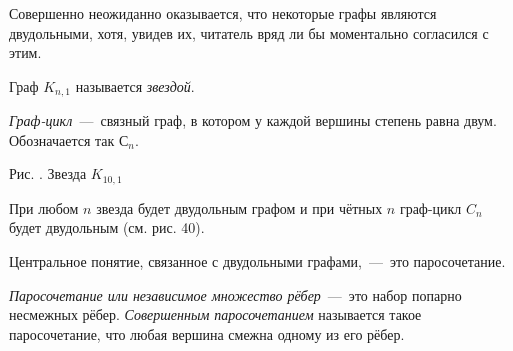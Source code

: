 \begin{paracol}{2}
	Совершенно неожиданно оказывается, что некоторые графы являются двудольными, хотя, 
	увидев их, читатель вряд ли бы моментально согласился с этим.

\begin{definition}
	Граф $K_{n, 1}$ называется \emph{звездой}.
\end{definition}
\begin{definition}
	\emph{Граф-цикл}~---~связный граф, в котором у каждой вершины степень равна двум. Обозначается так $С_n$.
\end{definition}

\switchcolumn
 
\begin{center}

	\small Рис. \images. Звезда $K_{10, 1}$
\end{center}\end{paracol}

	При любом $n$ звезда будет двудольным графом и при чётных $n$ граф-цикл $C_n$ будет двудольным (см. рис. 40).


	Центральное понятие, связанное с двудольными графами,~---~это паросочетание.
	
\begin{definition}
	\emph{Паросочетание или независимое множество рёбер}~---~это набор попарно несмежных рёбер. 
	\emph{Совершенным паросочетанием} называется такое паросочетание, что любая вершина смежна одному из его рёбер. 
\end{definition}

